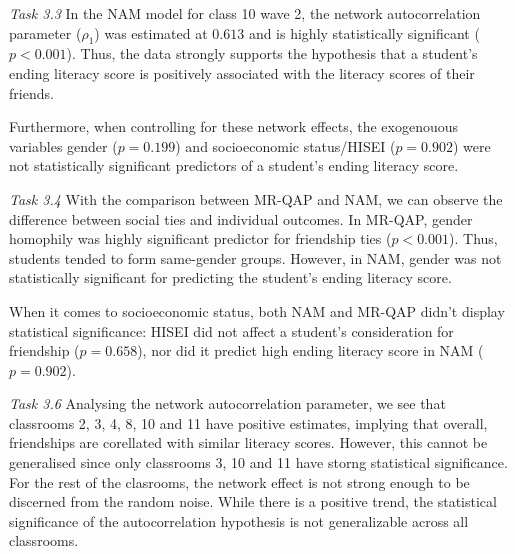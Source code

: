 \documentclass{article}
\begin{document}
\textit{Task 3.3}
In the NAM model for class 10 wave 2, the network autocorrelation parameter ($\rho_1$) was estimated at $0.613$ and is highly statistically significant ($p < 0.001$). Thus, the data strongly supports the hypothesis that a student's ending literacy score is positively associated with the literacy scores of their friends. 

Furthermore, when controlling for these network effects, the exogenouous variables gender ($p = 0.199$) and socioeconomic status/HISEI ($p = 0.902$) were not statistically significant predictors of a student's ending literacy score.

\textit{Task 3.4}  With the comparison between MR-QAP and NAM, we can observe the difference between social ties and individual outcomes.
In MR-QAP, gender homophily was highly significant predictor for friendship ties ($p < 0.001$). Thus, students 
tended to form same-gender groups. However, in NAM, gender was not statistically significant for predicting the student's ending literacy score.

When it comes to socioeconomic status, both NAM and MR-QAP didn't display statistical significance: HISEI did not affect a student's consideration for 
friendship ($p = 0.658$), nor did it predict high ending literacy score in NAM ($p = 0.902$).

\textit{Task 3.6}
Analysing the network autocorrelation parameter, we see that classrooms 2, 3, 4, 8, 10 and 11 have positive estimates, implying that overall, friendships are corellated with similar literacy scores. However, this cannot be generalised since only classrooms 3, 10 and 11 have storng statistical significance. For the rest of the clasrooms, the network effect is not strong enough to be discerned from the random noise. While there is a positive trend, the statistical significance of the autocorrelation hypothesis is not generalizable across all classrooms.
\end{document}
